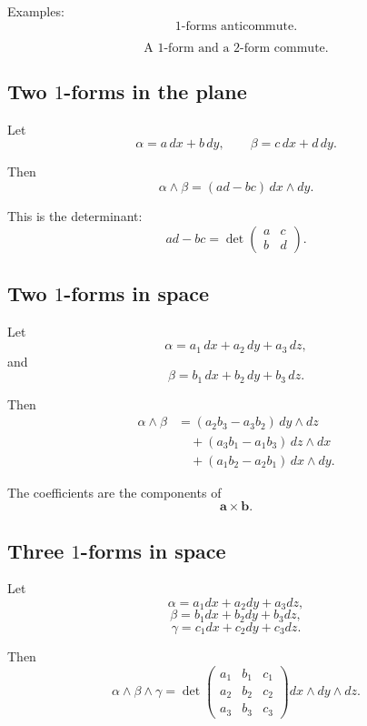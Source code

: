 Examples:
\[
\boxed{
    \text{\(1\)-forms anticommute.}
}
\]

\[
\boxed{
    \text{A \(1\)-form and a \(2\)-form commute.}
}
\]

\subsection*{Two \texorpdfstring{\(1\)}{1}-forms in the plane}

Let
\[
    \alpha=a\,dx+b\,dy,
    \qquad
    \beta=c\,dx+d\,dy.
\]

Then
\[
\boxed{
    \alpha\wedge\beta
    =
    (ad-bc)\,dx\wedge dy.
}
\]

This is the determinant:
\[
\boxed{
    ad-bc=
    \det
    \begin{pmatrix}
    a&c\\
    b&d
    \end{pmatrix}.
}
\]

\subsection*{Two \texorpdfstring{\(1\)}{1}-forms in space}

Let
\[
    \alpha=a_1\,dx+a_2\,dy+a_3\,dz,
\]
and
\[
    \beta=b_1\,dx+b_2\,dy+b_3\,dz.
\]

Then
\[
\boxed{
\begin{aligned}
\alpha\wedge\beta
&=
(a_2b_3-a_3b_2)\,dy\wedge dz\\
&\quad+
(a_3b_1-a_1b_3)\,dz\wedge dx\\
&\quad+
(a_1b_2-a_2b_1)\,dx\wedge dy.
\end{aligned}
}
\]

The coefficients are the components of
\[
\boxed{
    \mathbf a\times\mathbf b.
}
\]

\subsection*{Three \texorpdfstring{\(1\)}{1}-forms in space}

Let
\[
    \alpha=a_1dx+a_2dy+a_3dz,
\]
\[
    \beta=b_1dx+b_2dy+b_3dz,
\]
\[
    \gamma=c_1dx+c_2dy+c_3dz.
\]

Then
\[
\boxed{
    \alpha\wedge\beta\wedge\gamma
    =
    \det
    \begin{pmatrix}
    a_1&b_1&c_1\\
    a_2&b_2&c_2\\
    a_3&b_3&c_3
    \end{pmatrix}
    dx\wedge dy\wedge dz.
}
\]

